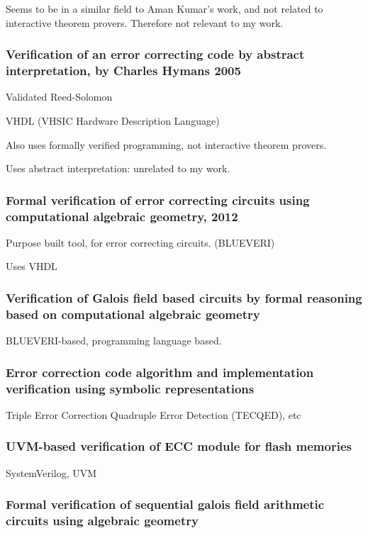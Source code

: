 \documentclass{article}
\begin{document}
Seems to be in a similar field to Aman Kumar's work, and not related to interactive theorem provers. Therefore not relevant to my work.

\subsubsection{Verification of an error correcting code by abstract interpretation, by Charles Hymans 2005}

Validated Reed-Solomon

VHDL (VHSIC Hardware Description Language)

Also uses formally verified programming, not interactive theorem provers.

Uses abstract interpretation: unrelated to my work.

\subsubsection{Formal verification of error correcting circuits using computational algebraic geometry, 2012}

Purpose built tool, for error correcting circuits. (BLUEVERI)

Uses VHDL

\subsubsection{Verification of Galois field based circuits by formal reasoning based on computational algebraic geometry}

BLUEVERI-based, programming language based.

\subsubsection{Error correction code algorithm and implementation verification using symbolic representations}

 Triple Error Correction Quadruple Error Detection (TECQED), etc

\subsubsection{UVM-based verification of ECC module for flash memories}

SystemVerilog, UVM

\subsubsection{Formal verification of sequential galois field arithmetic circuits using algebraic geometry}
\end{document}
